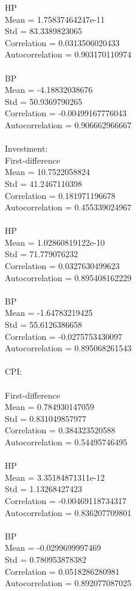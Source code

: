 \documentclass[letterpaper,12pt]{article}
\theoremstyle{definition}
\begin{document}
HP\\
Mean = 1.75837464247e-11\\
Std = 83.3389823065\\
Correlation = 0.0313506020433\\
Autocorrelation = 0.903170110974\\
\\
BP\\
Mean = -4.18832038676\\
Std = 50.9369790265\\
Correlation = -0.00499167776043\\
Autocorrelation = 0.906662966667\\
\\
Investment:\\

First-difference\\
Mean = 10.7522058824\\
Std = 41.2467110398\\
Correlation = 0.181971196678\\
Autocorrelation = 0.455339024967\\
\\
HP\\
Mean = 1.02860819122e-10\\
Std = 71.779076232\\
Correlation = 0.0327630499623\\
Autocorrelation = 0.895408162229\\
\\
BP\\
Mean = -1.64783219425\\
Std = 55.6126386658\\
Correlation = -0.0275753430097\\
Autocorrelation = 0.895068261543\\
\\
CPI:\\
\\
First-difference\\
Mean = 0.784930147059\\
Std = 0.831049857977\\
Correlation = 0.384323520588\\
Autocorrelation = 0.54495746495\\
\\
HP\\
Mean = 3.35184871311e-12\\
Std = 1.13268427423\\
Correlation = -0.00469118734317\\
Autocorrelation = 0.836207709801\\
\\
BP\\
Mean = -0.0299699997469\\
Std = 0.780953878382\\
Correlation = 0.0518286280981\\
Autocorrelation = 0.892077087025\\
\\
\end{document}
